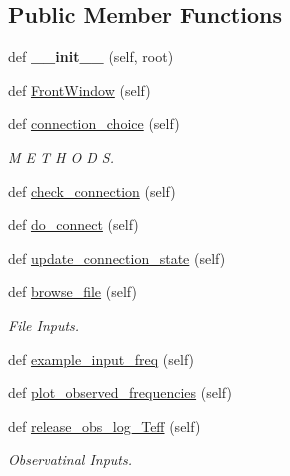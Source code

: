 \subsection*{Public Member Functions}
\begin{DoxyCompactItemize}
\item 
\mbox{\label{classasamba_1_1frontend__orig_1_1_g_u_i_a638a6ee5537927c1f13cdfacb5711168}} 
def {\bfseries \+\_\+\+\_\+init\+\_\+\+\_\+} (self, root)
\item 
def \hyperlink{classasamba_1_1frontend__orig_1_1_g_u_i_a0fd564268af273f977bc8065e26e110b}{Front\+Window} (self)
\item 
def \hyperlink{classasamba_1_1frontend__orig_1_1_g_u_i_af3fdec98d1b3657658a5f489b2246c34}{connection\+\_\+choice} (self)
\begin{DoxyCompactList}\small\item\em M E T H O D S. \end{DoxyCompactList}\item 
def \hyperlink{classasamba_1_1frontend__orig_1_1_g_u_i_ae71ecf0efcb575059e181ccd33f75178}{check\+\_\+connection} (self)
\item 
def \hyperlink{classasamba_1_1frontend__orig_1_1_g_u_i_a68a716eaa1fb6d82a7b004c77a5ab270}{do\+\_\+connect} (self)
\item 
def \hyperlink{classasamba_1_1frontend__orig_1_1_g_u_i_a4a594242291c4ab10089f279073ae8a7}{update\+\_\+connection\+\_\+state} (self)
\item 
def \hyperlink{classasamba_1_1frontend__orig_1_1_g_u_i_a5160be30a39afd49a2dd9ac4aba34d1d}{browse\+\_\+file} (self)
\begin{DoxyCompactList}\small\item\em File Inputs. \end{DoxyCompactList}\item 
def \hyperlink{classasamba_1_1frontend__orig_1_1_g_u_i_a6bb5f142abc9b56ccc0d7f9f7b3b99f1}{example\+\_\+input\+\_\+freq} (self)
\item 
def \hyperlink{classasamba_1_1frontend__orig_1_1_g_u_i_abb9e1670526f7bf28a6f2317e14546c0}{plot\+\_\+observed\+\_\+frequencies} (self)
\item 
def \hyperlink{classasamba_1_1frontend__orig_1_1_g_u_i_a5b038a5cef0239f96abd6accd44df396}{release\+\_\+obs\+\_\+log\+\_\+\+Teff} (self)
\begin{DoxyCompactList}\small\item\em Observatinal Inputs. \end{DoxyCompactList}\item 

\end{DoxyCompactItemize}
